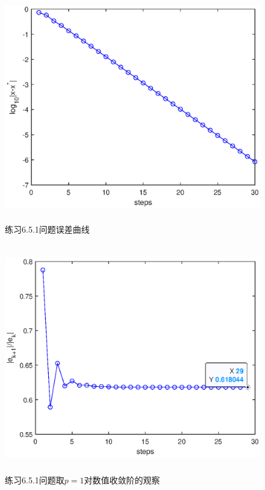 \documentclass[UTF8,a4paper,10pt]{ctexart}
\begin{document}
        \begin{figure}[htbp]
            \centering
            \includegraphics[width=14cm,height=10cm]{3_1_error.eps}
            \caption{练习6.5.1问题误差曲线}
        \end{figure}
        \begin{figure}[htbp]
            \centering
            \includegraphics[width=14cm,height=10cm]{3_1_order.eps}
            \caption{练习6.5.1问题取$p=1$对数值收敛阶的观察} 
        \end{figure}
\end{document}
